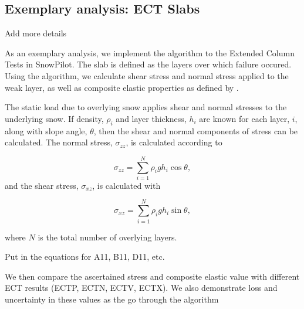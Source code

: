 \documentclass[journal abbreviation, manuscript]{copernicus}
\begin{document}



\subsection{Exemplary analysis: ECT Slabs}

\textcolor{RubineRed}{Add more details}

As an exemplary analysis, we implement the algorithm to the Extended Column Tests in SnowPilot. The slab is defined as the layers over which failure occured. Using the algorithm, we calculate shear stress and normal stress applied to the weak layer, as well as composite elastic properties as defined by \citet{weissgraeber2023}.

The static load due to overlying snow applies shear and normal stresses to the underlying snow. If density, $\rho_i$ and layer thickness, $h_i$ are known for each layer, $i$, along with slope angle, $\theta$, then the shear and normal components of stress can be calculated. The normal stress, $\sigma_{zz}$, is calculated according to

\begin{equation}
    \sigma_{zz} = \sum_{i=1}^N \rho_i g h_i \cos\theta,
\end{equation}
and the shear stress, $\sigma_{xz}$, is calculated with

\begin{equation}
    \sigma_{xz} = \sum_{i=1}^N \rho_i g h_i \sin\theta,
\end{equation}

\noindent where $N$ is the total number of overlying layers.

\textcolor{RubineRed}{Put in the equations for A11, B11, D11, etc.}

We then compare the ascertained stress and composite elastic value with different ECT results (ECTP, ECTN, ECTV, ECTX). We also demonstrate loss and uncertainty in these values as the go through the algorithm
\end{document}
